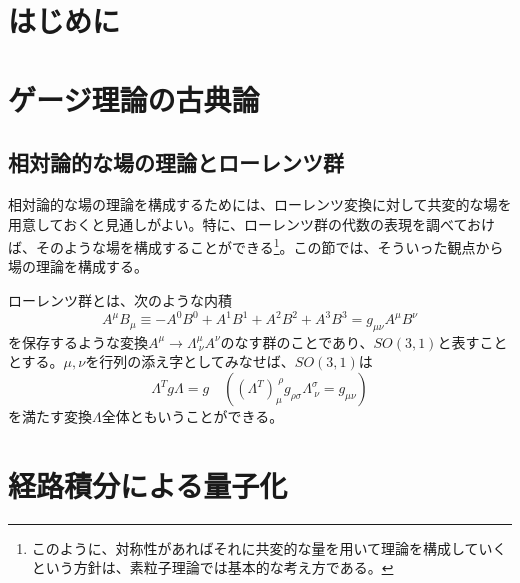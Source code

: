 \documentclass[unicode,a4paper,10pt]{ltjsarticle}
\begin{document}
\maketitle
\tableofcontents

\clearpage
\section{はじめに}




\clearpage
\section{ゲージ理論の古典論}

\subsection{相対論的な場の理論とローレンツ群}

相対論的な場の理論を構成するためには、ローレンツ変換に対して共変的な場を用意しておくと見通しがよい。特に、ローレンツ群の代数の表現を調べておけば、そのような場を構成することができる\footnote{
  このように、対称性があればそれに共変的な量を用いて理論を構成していくという方針は、素粒子理論では基本的な考え方である。
}。この節では、そういった観点から場の理論を構成する。

ローレンツ群とは、次のような内積
\begin{equation}
  A^{\mu}B_{\mu}
  \equiv
  -
  A^{0}B^{0}
  +
  A^{1}B^{1}
  +
  A^{2}B^{2}
  +
  A^{3}B^{3}
  =
  g_{\mu\nu}A^{\mu}B^{\nu}
\end{equation}
を保存するような変換$A^{\mu}\rightarrow\Lambda^{\mu}_{\ \nu}A^{\nu}$のなす群のことであり、$SO(3,1)$と表すこととする。$\mu,\nu$を行列の添え字としてみなせば、$SO(3,1)$は
\begin{equation}
  \Lambda^{T}g\Lambda
  =
  g
  \quad
  ((\Lambda^{T})^{\ \rho}_{\mu}g_{\rho\sigma}\Lambda^{\sigma}_{\ \nu}=g_{\mu\nu})
\end{equation}
を満たす変換$\Lambda$全体ともいうことができる。












\clearpage
\section{経路積分による量子化}
\end{document}
